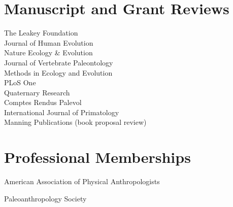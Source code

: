 \documentclass{article}
\newenvironment{mylist}
{\begin{description}[style=unboxed,leftmargin=1.3cm]}
{\end{description}}
\begin{document}
\section*{Manuscript and Grant Reviews}
The Leakey Foundation\\[4pt]
Journal of Human Evolution\\[4pt]
Nature Ecology \& Evolution\\[4pt]
Journal of Vertebrate Paleontology\\[4pt]
Methods in Ecology and Evolution\\[4pt]
PLoS One\\[4pt]
Quaternary Research\\[4pt]
Comptes Rendus Palevol\\[4pt]
International Journal of Primatology\\[4pt]
Manning Publications (book proposal review)\\

\section*{Professional Memberships}
\begin{mylist}
\item[] American Association of Physical Anthropologists
\item[] Paleoanthropology Society
\end{mylist}
\end{document}
